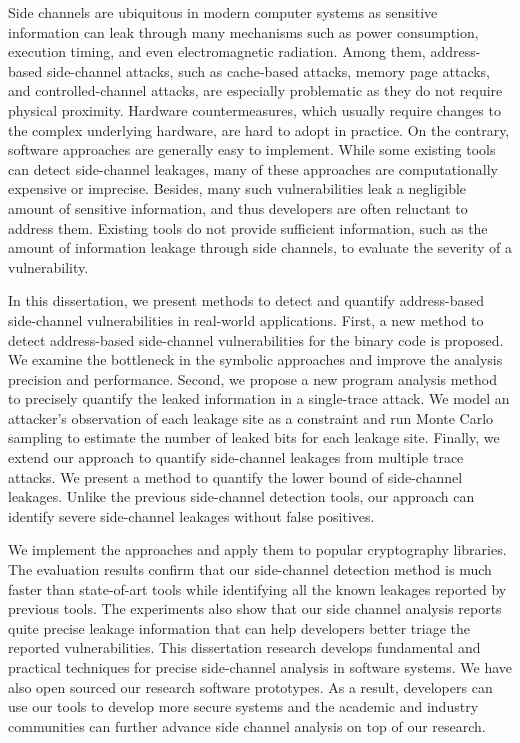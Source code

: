 
\vspace{-0.3in}
Side channels are ubiquitous in modern computer systems as sensitive
information can leak through many mechanisms such as power consumption, 
execution timing, and even electromagnetic radiation. Among them, 
address-based side-channel attacks, such as cache-based attacks, 
memory page attacks, and controlled-channel attacks, are especially
problematic as they do not require physical proximity. Hardware 
countermeasures, which usually require changes to the complex 
underlying hardware, are hard to adopt in practice.  On the contrary, 
software approaches are generally easy to implement. While some existing 
tools can detect side-channel leakages, many of these approaches are 
computationally expensive or imprecise. Besides, many such vulnerabilities 
leak a negligible amount of sensitive information, and thus developers 
are often reluctant to address them. Existing tools do not provide sufficient 
information, such as the amount of information leakage through side channels, 
to evaluate the severity of a vulnerability.

In this dissertation, we present methods to detect and quantify 
address-based side-channel vulnerabilities in real-world applications. 
First, a new method to detect address-based side-channel vulnerabilities 
for the binary code is proposed. We examine the bottleneck in the symbolic 
approaches and improve the analysis precision and performance.
Second, we propose a new program analysis method to precisely quantify
the leaked information in a single-trace attack. We model an
attacker’s observation of each leakage site as a constraint and run
Monte Carlo sampling to estimate the number of leaked bits for each
leakage site. Finally, we extend our approach to quantify side-channel 
leakages from multiple trace attacks. We present a method to quantify
the lower bound of side-channel leakages. Unlike the previous side-channel 
detection tools, our approach can identify severe side-channel
leakages without false positives. 

We implement the approaches and apply them to popular cryptography libraries.  
The evaluation results confirm that our side-channel detection method 
is much faster than state-of-art tools while identifying all the known leakages 
reported by previous tools.
The experiments also show that 
our side channel analysis reports quite precise leakage information
that can help developers better triage the reported vulnerabilities.
This dissertation research develops fundamental and practical techniques for precise side-channel 
analysis in software systems. We have also open sourced our research software prototypes.
As a result, developers can use our tools to develop more secure systems and the academic and industry
communities can further advance side channel analysis on top of our research.